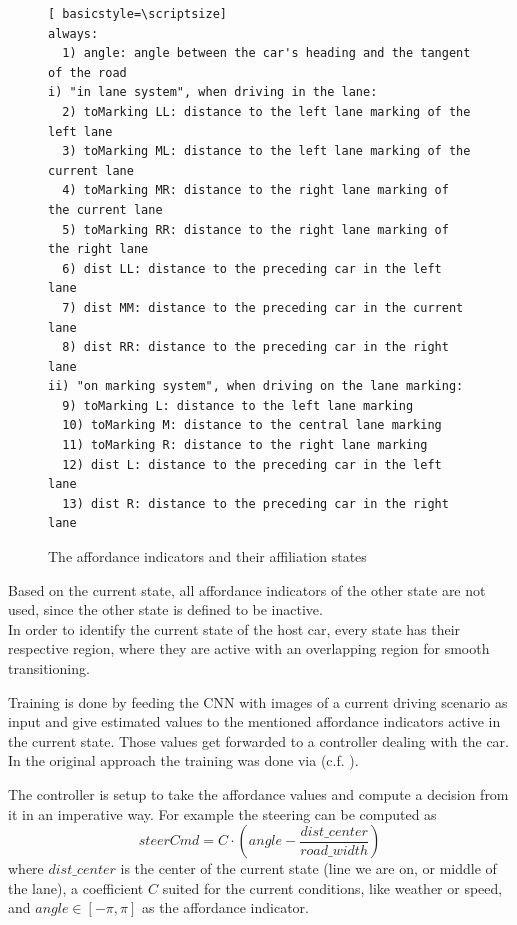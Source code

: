 \begin{figure}
\centering
\todoLine
\begin{lstlisting}[ basicstyle=\scriptsize]
always:
  1) angle: angle between the car's heading and the tangent of the road
i) "in lane system", when driving in the lane:
  2) toMarking LL: distance to the left lane marking of the left lane
  3) toMarking ML: distance to the left lane marking of the current lane
  4) toMarking MR: distance to the right lane marking of the current lane
  5) toMarking RR: distance to the right lane marking of the right lane
  6) dist LL: distance to the preceding car in the left lane
  7) dist MM: distance to the preceding car in the current lane
  8) dist RR: distance to the preceding car in the right lane
ii) "on marking system", when driving on the lane marking:
  9) toMarking L: distance to the left lane marking
  10) toMarking M: distance to the central lane marking
  11) toMarking R: distance to the right lane marking
  12) dist L: distance to the preceding car in the left lane
  13) dist R: distance to the preceding car in the right lane
\end{lstlisting}

\todoLine
\caption{The affordance indicators and their affiliation states}
\label{lst: affordance indicators}
\end{figure}

Based on the current state, all affordance indicators of the other state are not used, since the other state is defined to be inactive.\\
In order to identify the current state of the host car, every state has their respective region, where they are active with an overlapping region for smooth transitioning.

Training is done by feeding the CNN with images of a current driving scenario as input and give estimated values to the mentioned affordance indicators active in the current state. Those values get forwarded to a controller dealing with the car. In the original approach the training was done via \torcs (c.f. ).

The controller is setup to take the affordance values and compute a decision from it in an imperative way. For example the steering can be computed as 
	$$ steerCmd = C \cdot (angle-\frac{dist\_center}{road\_width})$$
where $dist\_center$ is the center of the current state (line we are on, or middle of the lane), a coefficient $C$ suited for the current conditions, like weather or speed, and $angle\in [-\pi, \pi]$ as the affordance indicator.

